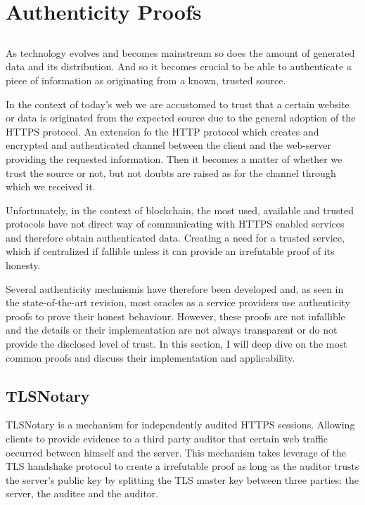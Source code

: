 \chapter{Authenticity Proofs}\label{chap:chap4}

\section*{}
As technology evolves and becomes mainstream so does the amount of generated data and its distribution. And so it becomes crucial to be able to authenticate a piece of information as originating from a known, trusted source. 

In the context of today's web we are accustomed to trust that a certain website or data is originated from the expected source due to the general adoption of the HTTPS protocol. An extension fo the HTTP protocol which creates and encrypted and authenticated channel between the client and the web-server providing the requested information. Then it becomes a matter of whether we trust the source or not, but not doubts are raised as for the channel through which we received it.

Unfortunately, in the context of blockchain, the most used, available and trusted protocols have not direct way of communicating with HTTPS enabled services and therefore obtain authenticated data. Creating a need for a trusted service, which if centralized if fallible unless it can provide an irrefutable proof of its honesty. 

Several authenticity mechnismis have therefore been developed and, as seen in the state-of-the-art revision, most oracles as a service providers use authenticity proofs to prove their honest behaviour. However, these proofs are not infallible and the details or their implementation are not always transparent or do not provide the disclosed level of trust. In this section, I will deep dive on the most common proofs and discuss their implementation and applicability.


\section{TLSNotary}

TLSNotary is a mechanism for independently audited HTTPS sessions. Allowing clients to provide evidence to a third party auditor that certain web traffic occurred between himself and the server. This mechanism takes leverage of the TLS handshake protocol to create a irrefutable proof as long as the auditor trusts the server's public key by splitting the TLS master key between three parties: the server, the auditee and the auditor.

